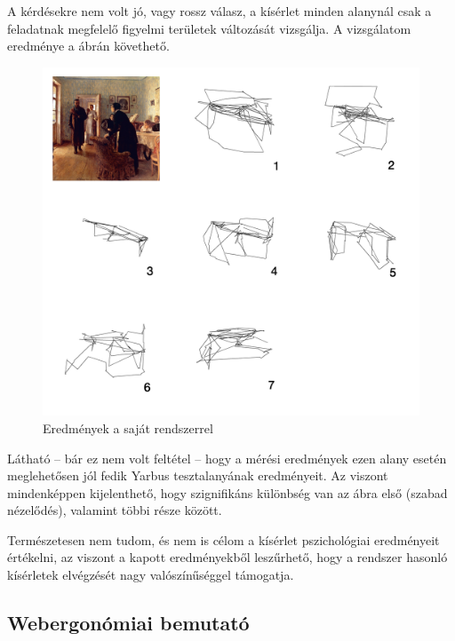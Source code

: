 A kérdésekre nem volt jó, vagy rossz válasz, a kísérlet minden alanynál csak a feladatnak megfelelő figyelmi területek változását vizsgálja. A vizsgálatom eredménye a  ábrán követhető.

\begin{figure}[!ht]
\centering
\includegraphics[width=140mm, keepaspectratio]{figures/yarbus_eredmeny.png}
\caption{Eredmények a saját rendszerrel}
\label{fig:eredmeny}
\end{figure}

Látható -- bár ez nem volt feltétel -- hogy a mérési eredmények ezen alany esetén meglehetősen jól fedik Yarbus tesztalanyának eredményeit. Az viszont mindenképpen kijelenthető, hogy szignifikáns különbség van az ábra első (szabad nézelődés), valamint többi része között.

Természetesen nem tudom, és nem is célom a kísérlet pszichológiai eredményeit értékelni, az viszont a kapott eredményekből leszűrhető, hogy a rendszer hasonló kísérletek elvégzését nagy valószínűséggel támogatja.

\subsection{Webergonómiai bemutató}\label{sect:web}


